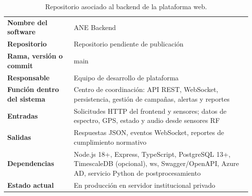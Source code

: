 \begin{table}[H]
\centering
\caption{Repositorio asociado al backend de la plataforma web.}
\label{tab:repo_backend}
\begin{tabularx}{\textwidth}{>{\bfseries}l X}
\toprule
Nombre del software & ANE Backend \\
Repositorio & Repositorio pendiente de publicación \\
Rama, versión o commit & main \\
Responsable & Equipo de desarrollo de plataforma \\
Función dentro del sistema & Centro de coordinación: API REST, WebSocket,
persistencia, gestión de campañas, alertas y reportes \\
Entradas & Solicitudes HTTP del frontend y sensores; datos de espectro, GPS,
estado y audio desde sensores RF \\
Salidas & Respuestas JSON, eventos WebSocket, reportes de cumplimiento
normativo \\
Dependencias & Node.js 18+, Express, TypeScript, PostgreSQL 13+, TimescaleDB
(opcional), ws, Swagger/OpenAPI, Azure AD, servicio Python de
postprocesamiento \\
Estado actual & En producción en servidor institucional privado \\
\bottomrule
\end{tabularx}
\end{table}
